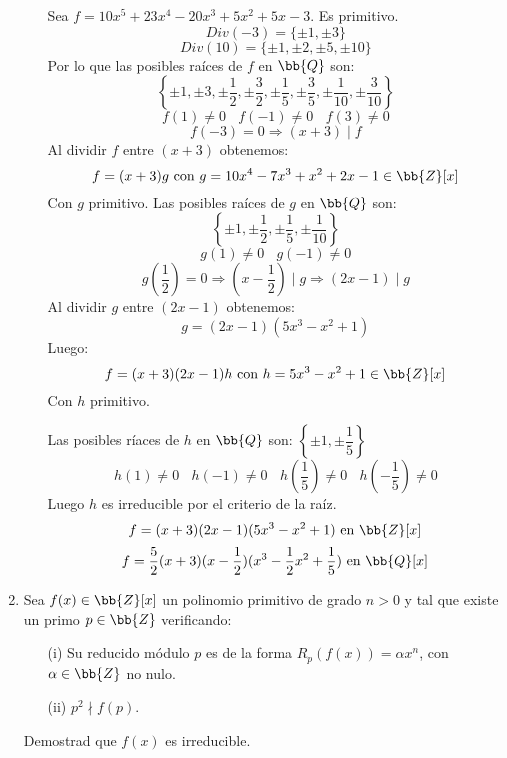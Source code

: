 \documentclass[12pt]{article}
\newcounter{ejercicio}[section] %
\newcounter{ejercicio}
\begin{document}
\begin{ejercicio}[3.5 puntos]
\begin{enumerate}
\begin{enumerate}
                    \noindent
                    Sea $f = 10x^5 + 23x^4 -20x^3 + 5x^2 + 5x-3$. Es primitivo.
                    $$Div(-3) = \{ \pm 1, \pm 3 \}$$
                    $$Div(10) = \{ \pm 1, \pm 2, \pm 5, \pm 10 \}$$
                    Por lo que las posibles raíces de $f$ en $\bb{Q}$ son:
                $$\left\{ \pm 1, \pm 3, \pm \dfrac{1}{2}, \pm \dfrac{3}{2}, \pm \dfrac{1}{5}, \pm \dfrac{3}{5}, \pm \dfrac{1}{10}, \pm \dfrac{3}{10} \right\}$$
                    $$f(1) \neq 0~~~~f(-1)\neq 0~~~~f(3) \neq 0$$
                    $$f(-3) = 0 \Rightarrow (x+3)\mid f$$
                    Al dividir $f$ entre $(x+3)$ obtenemos:
                    $$f = (x+3)g \mbox{ con } g=10x^4-7x^3+x^2+2x-1 \in \bb{Z}[x]$$
                    Con $g$ primitivo. Las posibles raíces de $g$ en $\bb{Q}$ son:
                    $$\left\{ \pm 1, \pm \dfrac{1}{2}, \pm \dfrac{1}{5}, \pm \dfrac{1}{10} \right\}$$
                    $$g(1) \neq 0~~~~g(-1)\neq 0$$
                    $$g\left(\dfrac{1}{2}\right) = 0 \Rightarrow \left(x-\dfrac{1}{2}\right) \mid g \Rightarrow (2x-1)\mid g$$
                    Al dividir $g$ entre $(2x-1)$ obtenemos:
                    $$g = (2x-1)(5x^3-x^2+1)$$
                    Luego:
                    $$f = (x+3)(2x-1)h \mbox{ con } h = 5x^3-x^2+1 \in \bb{Z}[x]$$
                    Con $h$ primitivo.

                    \noindent
                    Las posibles ríaces de $h$ en $\bb{Q}$ son: $\left\{ \pm 1, \pm \dfrac{1}{5} \right\}$
                    $$h(1) \neq 0~~~~h(-1)\neq 0~~~~h\left(\dfrac{1}{5}\right) \neq 0 ~~~~h\left(-\dfrac{1}{5}\right) \neq 0$$
                    Luego $h$ es irreducible por el criterio de la raíz.\\
                    $$f = (x+3)(2x-1)(5x^3-x^2+1) \mbox{ en } \bb{Z}[x]$$
                    $$f = \dfrac{5}{2}(x+3)(x-\dfrac{1}{2})(x^3-\dfrac{1}{2}x^2+\dfrac{1}{5}) \mbox{ en } \bb{Q}[x]$$

                    


            \end{enumerate}
            \item Sea $f(x) \in \bb{Z}[x]$ un polinomio primitivo de grado $n>0$ y tal que existe un primo $p \in \bb{Z}$ verificando:
                \begin{enumerate}
                    \item[(i)] Su reducido módulo $p$ es de la forma $R_p(f(x)) = \alpha x^n$, con $\alpha \in \bb{Z}$ no nulo.
                    \item[(ii)] $p^2 \nmid f(p)$. 
                \end{enumerate}
                Demostrad que $f(x)$ es irreducible.
        \end{enumerate}
    \end{ejercicio}
\end{document}
